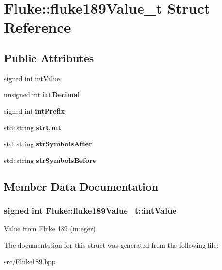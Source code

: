 \hypertarget{structFluke_1_1fluke189Value__t}{
\section{Fluke::fluke189Value\_\-t Struct Reference}
\label{structFluke_1_1fluke189Value__t}
}
\subsection*{Public Attributes}
\begin{DoxyCompactItemize}
\item 
signed int \hyperlink{structFluke_1_1fluke189Value__t_a3f6a2683d24ecb1c11565c0c419056aa}{intValue}
\item 
\hypertarget{structFluke_1_1fluke189Value__t_aef89fa78fef27b8156b41d8eec45a525}{
unsigned int {\bfseries intDecimal}}
\label{structFluke_1_1fluke189Value__t_aef89fa78fef27b8156b41d8eec45a525}

\item 
\hypertarget{structFluke_1_1fluke189Value__t_a40a8650261d9ce76305843c74a450977}{
signed int {\bfseries intPrefix}}
\label{structFluke_1_1fluke189Value__t_a40a8650261d9ce76305843c74a450977}

\item 
\hypertarget{structFluke_1_1fluke189Value__t_ad0a18b625763f4c2a41630a43686e9db}{
std::string {\bfseries strUnit}}
\label{structFluke_1_1fluke189Value__t_ad0a18b625763f4c2a41630a43686e9db}

\item 
\hypertarget{structFluke_1_1fluke189Value__t_a13d7365bbe153dc59ba13ce6f0d36898}{
std::string {\bfseries strSymbolsAfter}}
\label{structFluke_1_1fluke189Value__t_a13d7365bbe153dc59ba13ce6f0d36898}

\item 
\hypertarget{structFluke_1_1fluke189Value__t_aa587f8e6f56f51feb388a1b3972cc82f}{
std::string {\bfseries strSymbolsBefore}}
\label{structFluke_1_1fluke189Value__t_aa587f8e6f56f51feb388a1b3972cc82f}

\end{DoxyCompactItemize}


\subsection{Member Data Documentation}
\hypertarget{structFluke_1_1fluke189Value__t_a3f6a2683d24ecb1c11565c0c419056aa}{
\subsubsection[{intValue}]{\setlength{\rightskip}{0pt plus 5cm}signed int {\bf Fluke::fluke189Value\_\-t::intValue}}}
\label{structFluke_1_1fluke189Value__t_a3f6a2683d24ecb1c11565c0c419056aa}
Value from Fluke 189 (integer) 

The documentation for this struct was generated from the following file:\begin{DoxyCompactItemize}
\item 
src/Fluke189.hpp\end{DoxyCompactItemize}
